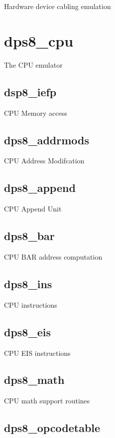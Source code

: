 \documentclass[notitlepage]{report}
\begin{document}
Hardware device cabling emulation

\section{dps8\_cpu} 

The CPU emulator

\subsection{dsp8\_iefp}

CPU Memory access

\subsection{dps8\_addrmods}

CPU Address Modifcation

\subsection{dps8\_append}

CPU Append Unit

\subsection{dps8\_bar}

CPU BAR address computation

\subsection{dps8\_ins}

CPU instructions

\subsection{dps8\_eis}

CPU EIS instructions

\subsection{dps8\_math}

CPU math support routines

\subsection{dps8\_opcodetable}
\end{document}
